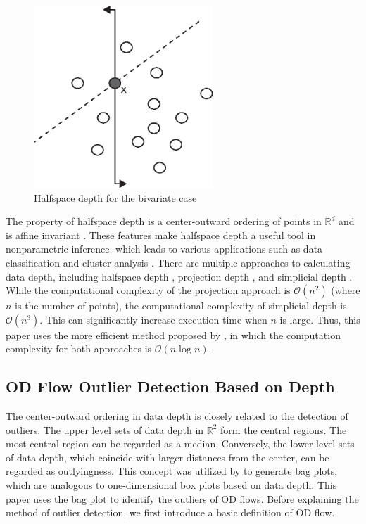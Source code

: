 \documentclass[a4paper,UKenglish]{lipics-v2018}
\begin{document}
\begin{figure}
	\centering
	\includegraphics[width=0.6\textwidth]{images/depth_bi.eps}
	\caption{Halfspace depth for the bivariate case}
	\label{fig:hd_bi}	
\end{figure}

The property of halfspace depth is a center-outward ordering of points in $\mathbb{R}^d$ and is affine invariant \cite{Mosler13book}.
These features make halfspace depth a useful tool in nonparametric inference, which leads to various applications such as data classification and cluster analysis \cite{lange14fSP,jeong16acmgis}.
There are multiple approaches to calculating data depth, including halfspace depth \cite{rousseeuw96RSS}, projection depth \cite{wilcox03CSSC}, and simplicial depth \cite{liu90AS}.
While the computational complexity of the projection approach is $\mathcal{O}(n^2)$ (where $n$ is the number of points), the computational complexity of simplicial depth is $\mathcal{O}(n^3)$.
This can significantly increase execution time when $n$ is large.
Thus, this paper uses the more efficient method proposed by \cite{rousseeuw96RSS}, in which the computation complexity for both approaches is $\mathcal{O}(n\log{}n)$.

\subsection{OD Flow Outlier Detection Based on Depth}
The center-outward ordering in data depth is closely related to the detection of outliers.
The upper level sets of data depth in $\mathbb{R}^2$ form the central regions.
The most central region can be regarded as a median.
Conversely, the lower level sets of data depth, which coincide with larger distances from the center, can be regarded as outlyingness.
This concept was utilized by \cite{rousseeuw99AS,aplpackR} to generate bag plots, which are analogous to one-dimensional box plots based on data depth.
This paper uses the bag plot to identify the outliers of OD flows.
Before explaining the method of outlier detection, we first introduce a basic definition of OD flow.
\end{document}
